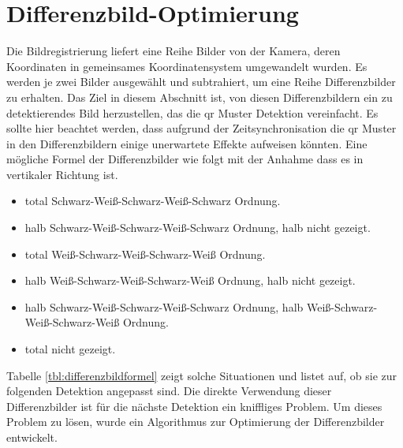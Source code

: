 \section{Differenzbild-Optimierung}
Die Bildregistrierung liefert eine Reihe Bilder von der Kamera, deren Koordinaten in gemeinsames Koordinatensystem umgewandelt wurden. Es werden je zwei Bilder ausgewählt und subtrahiert, um eine Reihe Differenzbilder zu erhalten. Das Ziel in diesem Abschnitt ist, von diesen Differenzbildern ein zu detektierendes Bild herzustellen, das die \gls{qr} Muster Detektion vereinfacht. Es sollte hier beachtet werden, dass aufgrund der Zeitsynchronisation die \gls{qr} Muster in den Differenzbildern einige unerwartete Effekte aufweisen könnten. Eine mögliche Formel der Differenzbilder wie folgt mit der Anhahme dass es in vertikaler Richtung ist.

\begin{itemize}
	\item total Schwarz-Weiß-Schwarz-Weiß-Schwarz Ordnung.
	\item halb Schwarz-Weiß-Schwarz-Weiß-Schwarz Ordnung, halb nicht gezeigt.
	\item total Weiß-Schwarz-Weiß-Schwarz-Weiß Ordnung.
	\item halb Weiß-Schwarz-Weiß-Schwarz-Weiß Ordnung, halb nicht gezeigt.
	\item halb Schwarz-Weiß-Schwarz-Weiß-Schwarz Ordnung, halb Weiß-Schwarz-Weiß-Schwarz-Weiß Ordnung.
	\item total nicht gezeigt.
\end{itemize}

Tabelle \ref{tbl:differenzbildformel} zeigt solche Situationen und listet auf, ob sie zur folgenden Detektion angepasst sind. Die direkte Verwendung dieser Differenzbilder ist für die nächste Detektion ein kniffliges Problem. Um dieses Problem zu lösen, wurde ein Algorithmus zur Optimierung der Differenzbilder entwickelt.

